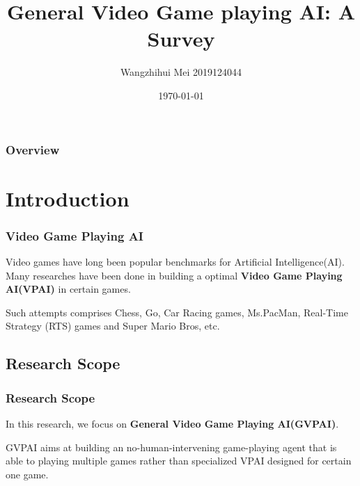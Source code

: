 \documentclass{beamer}
\title[Short title]{General Video Game playing AI: A Survey} %
\author{ Wangzhihui Mei 2019124044} %
\institute[JI] %
{
CCNU-UOW JI \\ %
\medskip
\textit{maywzh@gmail.com} %
}
\date{\today} %
\begin{document}
\begin{frame}
\titlepage %
\end{frame}

\begin{frame}
\frametitle{Overview} %
\tableofcontents %
\end{frame}


\section{Introduction}
\begin{frame}
\frametitle{Video Game Playing AI}
Video games have long been popular benchmarks for Artificial Intelligence(AI)\cite{1}. Many researches have been done in building a optimal \textbf{Video Game Playing AI(VPAI)}  in certain games. 

Such attempts comprises Chess, Go, Car Racing games, Ms.PacMan, Real-Time Strategy (RTS) games and Super Mario Bros, etc. 
\end{frame}

\subsection{Research Scope}
\begin{frame}
  \frametitle{Research Scope}
  In this research, we focus on \textbf{General Video Game Playing AI(GVPAI)}.

  GVPAI aims at building an no-human-intervening game-playing agent that is able to playing multiple games rather than specialized VPAI designed for certain one game\cite{1}.

\end{frame}
\end{document}
